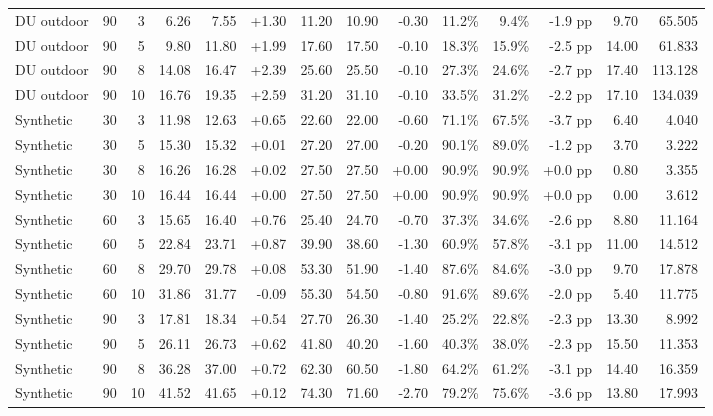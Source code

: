 \documentclass[10pt,a4paper]{article}
\begin{document}
\begin{landscape}
\begin{longtable}{@{}llrrrrrrrrrrrr@{}}
DU outdoor & 90 & 3 & 6.26 & 7.55 & +1.30 & 11.20 & 10.90 & -0.30 & 11.2\% & 9.4\% & -1.9 pp & 9.70 & 65.505 \\

DU outdoor & 90 & 5 & 9.80 & 11.80 & +1.99 & 17.60 & 17.50 & -0.10 & 18.3\% & 15.9\% & -2.5 pp & 14.00 & 61.833 \\

DU outdoor & 90 & 8 & 14.08 & 16.47 & +2.39 & 25.60 & 25.50 & -0.10 & 27.3\% & 24.6\% & -2.7 pp & 17.40 & 113.128 \\

DU outdoor & 90 & 10 & 16.76 & 19.35 & +2.59 & 31.20 & 31.10 & -0.10 & 33.5\% & 31.2\% & -2.2 pp & 17.10 & 134.039 \\

Synthetic & 30 & 3 & 11.98 & 12.63 & +0.65 & 22.60 & 22.00 & -0.60 & 71.1\% & 67.5\% & -3.7 pp & 6.40 & 4.040 \\

Synthetic & 30 & 5 & 15.30 & 15.32 & +0.01 & 27.20 & 27.00 & -0.20 & 90.1\% & 89.0\% & -1.2 pp & 3.70 & 3.222 \\

Synthetic & 30 & 8 & 16.26 & 16.28 & +0.02 & 27.50 & 27.50 & +0.00 & 90.9\% & 90.9\% & +0.0 pp & 0.80 & 3.355 \\

Synthetic & 30 & 10 & 16.44 & 16.44 & +0.00 & 27.50 & 27.50 & +0.00 & 90.9\% & 90.9\% & +0.0 pp & 0.00 & 3.612 \\

Synthetic & 60 & 3 & 15.65 & 16.40 & +0.76 & 25.40 & 24.70 & -0.70 & 37.3\% & 34.6\% & -2.6 pp & 8.80 & 11.164 \\

Synthetic & 60 & 5 & 22.84 & 23.71 & +0.87 & 39.90 & 38.60 & -1.30 & 60.9\% & 57.8\% & -3.1 pp & 11.00 & 14.512 \\

Synthetic & 60 & 8 & 29.70 & 29.78 & +0.08 & 53.30 & 51.90 & -1.40 & 87.6\% & 84.6\% & -3.0 pp & 9.70 & 17.878 \\

Synthetic & 60 & 10 & 31.86 & 31.77 & -0.09 & 55.30 & 54.50 & -0.80 & 91.6\% & 89.6\% & -2.0 pp & 5.40 & 11.775 \\

Synthetic & 90 & 3 & 17.81 & 18.34 & +0.54 & 27.70 & 26.30 & -1.40 & 25.2\% & 22.8\% & -2.3 pp & 13.30 & 8.992 \\

Synthetic & 90 & 5 & 26.11 & 26.73 & +0.62 & 41.80 & 40.20 & -1.60 & 40.3\% & 38.0\% & -2.3 pp & 15.50 & 11.353 \\

Synthetic & 90 & 8 & 36.28 & 37.00 & +0.72 & 62.30 & 60.50 & -1.80 & 64.2\% & 61.2\% & -3.1 pp & 14.40 & 16.359 \\

Synthetic & 90 & 10 & 41.52 & 41.65 & +0.12 & 74.30 & 71.60 & -2.70 & 79.2\% & 75.6\% & -3.6 pp & 13.80 & 17.993 \\

\bottomrule\end{longtable}\end{landscape}
\end{document}
